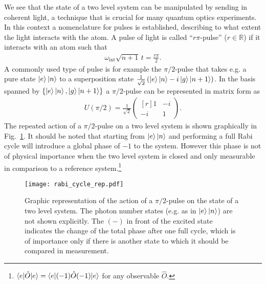 We see that the state of a two level system can be manipulated by sending in coherent
  light, a technique that is crucial for many quantum optics experiments. In this 
context a nomenclature for pulses is established, describing to what extent the
light interacts with the atom. A pulse of light is called ``$ r\pi$-pulse'' ($r\in \mathbb{R}$)
if it interacts with an atom such that
\begin{align}
  \label{eq:r_pulse}
  \omega_{\text{int}}\sqrt{n+1}\, t = \frac{r \pi}{2}.
\end{align}
A commonly used type of pulse is for example the $\pi/2$-pulse that takes e.g. a
pure state $\ket{e}\ket{n}$ to a superposition
state $\frac{1}{\sqrt{2}}\left(\ket{e}\ket{n}-i\ket{g}\ket{n+1}\right)$. In the basis spanned by $\left\lbrace
\ket{e}\ket{n}, \ket{g}\ket{n+1}\right\rbrace$ a $\pi/2$-pulse can be
represented in matrix form as
\begin{align}
  \label{eq:pi_half_matrix}
U(\pi/2) = \frac{1}{\sqrt{2}}  
\begin{pmatrix*}[r] 
      1 & -i \\
      -i & 1
    \end{pmatrix*}.
\end{align}
The repeated action of a $\pi/2$-pulse on a two level system is shown
graphically in Fig.~\ref{fig:rabi_cycle_rep}. It should be noted that starting
from $\ket{e}\ket{n}$ and performing a full Rabi cycle will introduce a global
phase of $-1$ to the system. However this phase is not of physical importance
when the two level system is closed and only measurable in comparison to a
reference system.\footnote{$\braket{e|\hat{O}|e} = \braket{e|(-1)\hat{O}(-1)|e}$
for any observable $\hat{O}$.}
\begin{figure}[h]
  \centering
  \texttt{[image: rabi\_cycle\_rep.pdf]}
  \caption{Graphic representation of the action of a $\pi/2$-pulse on the state
    of a two level system. The photon number states (e.g. as in $\ket{e}\ket{n}$)
    are not shown explicitly. The $(-)$ in front of the excited state indicates
  the change of the total phase after one full cycle, which is of importance
only if there is another state to which it should be compared in measurement.}
  \label{fig:rabi_cycle_rep}
\end{figure}

